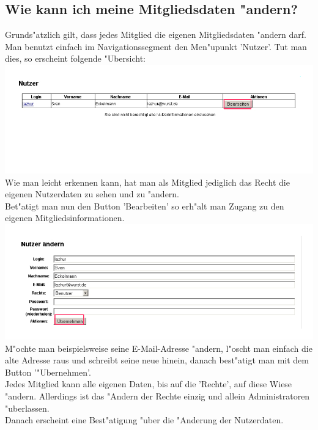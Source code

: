 \subsection{Wie kann ich meine Mitgliedsdaten "andern?}
Grunds"atzlich gilt, dass jedes Mitglied die eigenen Mitgliedsdaten "andern darf.\\ Man benutzt einfach im Navigationssegment den Men"upunkt 'Nutzer'. Tut man dies, so erscheint folgende "Ubersicht:\\
\includegraphics[scale=0.8]{nutzer1}\\
Wie man leicht erkennen kann, hat man als Mitglied jediglich das Recht die eigenen Nutzerdaten zu sehen und zu "andern.\\
Bet"atigt man nun den Button 'Bearbeiten' so erh"alt man Zugang zu den eigenen Mitgliedsinformationen.\\
\includegraphics[scale=0.8]{nutzer2}\\
M"ochte man beispielsweise seine E-Mail-Adresse "andern, l"oscht man einfach die alte Adresse raus und schreibt seine neue hinein, danach best"atigt man mit dem Button '"Ubernehmen'.\\
Jedes Mitglied kann alle eigenen Daten, bis auf die 'Rechte', auf diese Wiese "andern. Allerdings ist das "Andern der Rechte einzig und allein Administratoren "uberlassen.\\
Danach erscheint eine Best"atigung "uber die "Anderung der Nutzerdaten.\\
